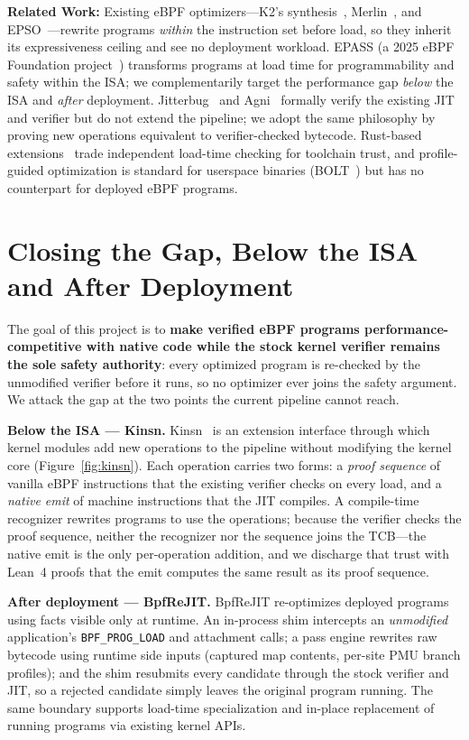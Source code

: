 \noindent\textbf{Related Work:} Existing eBPF optimizers---K2's synthesis~\cite{xu2021synthesizing}, Merlin~\cite{mao2024merlin}, and EPSO~\cite{zhu2025epso}---rewrite programs \emph{within} the instruction set before load, so they inherit its expressiveness ceiling and see no deployment workload.  EPASS (a 2025 eBPF Foundation project~\cite{huang2025epass}) transforms programs at load time for programmability and safety within the ISA; we complementarily target the performance gap \emph{below} the ISA and \emph{after} deployment.  Jitterbug~\cite{nelson2020specification} and Agni~\cite{vishwanathan2023verifying} formally verify the existing JIT and verifier but do not extend the pipeline; we adopt the same philosophy by proving new operations equivalent to verifier-checked bytecode.  Rust-based extensions~\cite{jia2025rex} trade independent load-time checking for toolchain trust, and profile-guided optimization is standard for userspace binaries (BOLT~\cite{panchenko2019bolt}) but has no counterpart for deployed eBPF programs.

\section{Closing the Gap, Below the ISA and After Deployment}

The goal of this project is to \textbf{make verified eBPF programs performance-competitive with native code while the stock kernel verifier remains the sole safety authority}: every optimized program is re-checked by the unmodified verifier before it runs, so no optimizer ever joins the safety argument.  We attack the gap at the two points the current pipeline cannot reach.

\noindent\textbf{Below the ISA --- Kinsn.}  Kinsn~\cite{zheng2026kinsn} is an extension interface through which kernel modules add new operations to the pipeline without modifying the kernel core (Figure~\ref{fig:kinsn}).  Each operation carries two forms: a \emph{proof sequence} of vanilla eBPF instructions that the existing verifier checks on every load, and a \emph{native emit} of machine instructions that the JIT compiles.  A compile-time recognizer rewrites programs to use the operations; because the verifier checks the proof sequence, neither the recognizer nor the sequence joins the TCB---the native emit is the only per-operation addition, and we discharge that trust with Lean~4 proofs that the emit computes the same result as its proof sequence.

\noindent\textbf{After deployment --- BpfReJIT.}  BpfReJIT re-optimizes deployed programs using facts visible only at runtime.  An in-process shim intercepts an \emph{unmodified} application's \texttt{BPF\_PROG\_LOAD} and attachment calls; a pass engine rewrites raw bytecode using runtime side inputs (captured map contents, per-site PMU branch profiles); and the shim resubmits every candidate through the stock verifier and JIT, so a rejected candidate simply leaves the original program running.  The same boundary supports load-time specialization and in-place replacement of running programs via existing kernel APIs.

